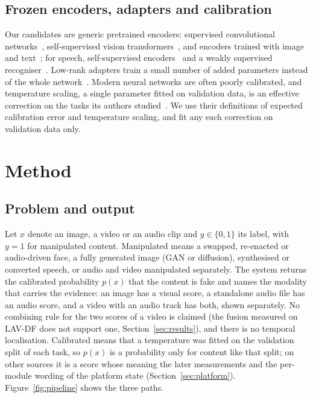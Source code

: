 \documentclass[conference,a4paper]{IEEEtran_nodash}
\begin{document}
\subsection{Frozen encoders, adapters and calibration}
Our candidates are generic pretrained encoders: supervised convolutional
networks~\cite{chollet2017xception,tan2019efficientnet}, self-supervised
vision transformers~\cite{oquab2024dinov2}, and encoders trained with image and
text~\cite{radford2021clip,zhai2023siglip}; for speech, self-supervised
encoders~\cite{baevski2020wav2vec2,hsu2021hubert,chen2022wavlm} and a
weakly supervised recogniser~\cite{radford2023whisper}. Low-rank
adapters train a small number of added parameters instead of the whole
network~\cite{hu2022lora}. Modern neural networks are often poorly
calibrated, and temperature scaling, a single parameter fitted on validation
data, is an effective correction on the tasks its authors
studied~\cite{guo2017calibration}. We use their definitions of expected
calibration error and temperature scaling, and fit any such correction on
validation data only.

\section{Method}\label{sec:method}

\subsection{Problem and output}
Let $x$ denote an image, a video or an audio clip and $y\in\{0,1\}$ its label,
with $y=1$ for manipulated content. Manipulated means a swapped, re-enacted or
audio-driven face, a fully generated image (GAN or diffusion), synthesised or
converted speech, or audio and video manipulated separately. The system returns
the calibrated probability $p(x)$ that the content is fake and names the
modality that carries the evidence: an image has a visual score, a standalone
audio file has an audio score, and a video with an audio track has both,
shown separately. No combining rule for the two scores of a video is claimed
(the fusion measured on LAV-DF does not support one, Section~\ref{sec:results}),
and there is no temporal localisation. Calibrated means that a temperature was
fitted on the validation split of each task, so $p(x)$ is a probability only for
content like that split; on other sources it is a score whose meaning the later
measurements and the per-module wording of the platform state
(Section~\ref{sec:platform}). Figure~\ref{fig:pipeline} shows the three paths.
\end{document}
